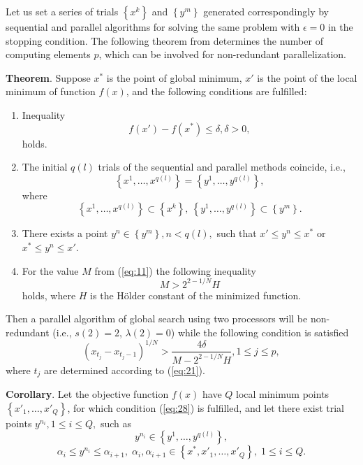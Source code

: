 \documentclass[smallcondensed]{svjour3}     %
\begin{document}
Let us set a series of trials $\left\{x^k\right\}$ and $\left\{y^m\right\}$ generated correspondingly by sequential and parallel algorithms for solving the same problem with $\epsilon = 0$ in the stopping condition. The following theorem from \cite{RefStrongin2000} determines the number of computing elements $p$, which can be involved for non-redundant parallelization.

\textbf{Theorem}. Suppose $x^\ast$ is the point of global minimum, $x'$ is the point of the local minimum of function $f(x)$, and the following conditions are fulfilled:
\begin{enumerate}
	\item
	Inequality 
	\begin{equation}\label{eq:28}
	f(x')-f(x^\ast)\leq \delta, \delta>0,
	\end{equation}
	holds.
	\item
	The initial $q(l)$ trials of the sequential and parallel methods coincide, i.e.,
	\[
	\left\{x^1,\dots,x^{q(l)}\right\}=\left\{y^1,\dots,y^{q(l)}\right\},
	\]
	where 
	\[
	\left\{x^1,\dots,x^{q(l)}\right\}\subset\left\{x^k\right\}, \ \left\{y^1,\dots,y^{q(l)}\right\}\subset\left\{y^m\right\}.
	\]
	\item
	There exists a point $y^n\in \left\{y^m\right\}, n<q(l),$ such that $x'\leq y^n \leq x^\ast$ or \mbox{$x^\ast \leq y^n \leq x'$}.
	\item
	For the value $M$ from (\ref{eq:11}) the following inequality
	\[
	M>2^{2-1/N}H
	\]
	holds, where $H$ is the H{\"o}lder constant of the minimized function.
\end{enumerate}

Then a parallel algorithm of global search using two processors will be non-redundant (i.e., $s(2)=2$, $\lambda(2)=0$) while the following condition is satisfied 
\begin{equation}\label{eq:32}
\left(x_{t_j}-x_{t_j-1}\right)^{1/N} > \frac{4\delta}{M-2^{2-1/N}H}, 1\leq j\leq p,	
\end{equation}
where $t_j$ are determined according to (\ref{eq:21}).

\textbf{Corollary}. Let the objective function $f(x)$ have $Q$ local minimum points $\left\{x'_1,\dots,x'_Q\right\}$, for which condition (\ref{eq:28}) is fulfilled, and let there exist trial points $y^{n_i}, 1\leq i \leq Q,$ such as
\[
y^{n_i}\in \left\{y^1,\dots,y^{q(l)}\right\},
\]
\[
\alpha_i \leq y^{n_i} \leq \alpha_{i+1}, \; \alpha_i, \alpha_{i+1} \in \left\{x^\ast, x'_1,\dots,x'_Q\right\}, \; 1\leq i \leq Q.
\]
\end{document}
